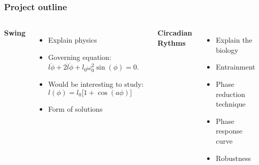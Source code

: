\documentclass[swedish, english]{beamer}
\begin{document}



\begin{frame}
\frametitle{Project outline}

\begin{columns}[c]
\textbf{Swing}
\begin{itemize}
\item Explain physics
\item Governing equation:
$l\ddot\phi + 2\dot{l}\dot{\phi} + l_0\omega_0^2\sin(\phi)=0$.
\item Would be interesting to study:
$l(\phi)=l_0\Big[1+\cos(a\phi)\Big]$
\item Form of solutions
\end{itemize}

\textbf{Circadian Rythms}
\begin{itemize}
\item Explain the biology
\item Entrainment
\item Phase reduction technique
\item Phase response curve
\item Robustness
\end{itemize}

\end{columns}
\end{frame}





\end{document}
